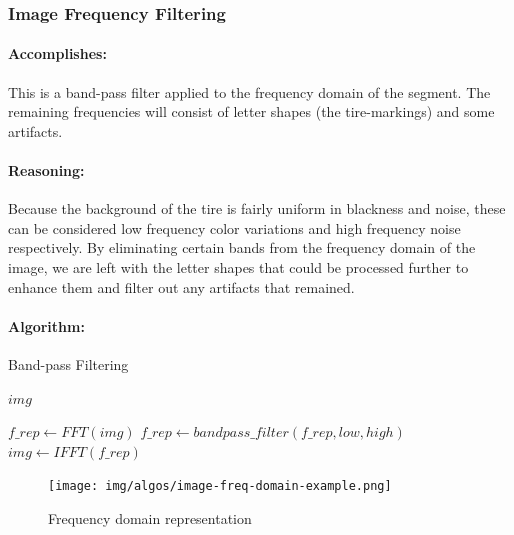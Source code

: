 \subsubsection{Image Frequency Filtering}
\label{subsubsec:frequency-filtering}

\paragraph*{Accomplishes:}\mbox{}\par
This is a band-pass filter applied to the frequency domain of the segment. The remaining frequencies will consist of letter shapes (the tire-markings) and some artifacts.

\paragraph*{Reasoning:}\mbox{}\par
Because the background of the tire is fairly uniform in blackness and noise, these can be considered low frequency color variations and high frequency noise respectively. By eliminating certain bands from the frequency domain of the image, we are left with the letter shapes that could be processed further to enhance them and filter out any artifacts that remained.

\paragraph*{Algorithm:}\mbox{}\par

\begin{algorithm}
    \caption{Band-pass Filtering}\label{alg:frequency-filtering}
    \begin{algorithmic}[1]
        \Require $img$

        \State $f\_rep \gets FFT(img)$
        \State $f\_rep \gets bandpass\_filter(f\_rep, low, high)$
        \State $img \gets IFFT(f\_rep)$

    \end{algorithmic}
\end{algorithm}

\begin{figure}
    \centering
    \texttt{[image: img/algos/image-freq-domain-example.png]}
    \caption{Frequency domain representation}
    \label{fig:example-img-freq-domain}
\end{figure}

